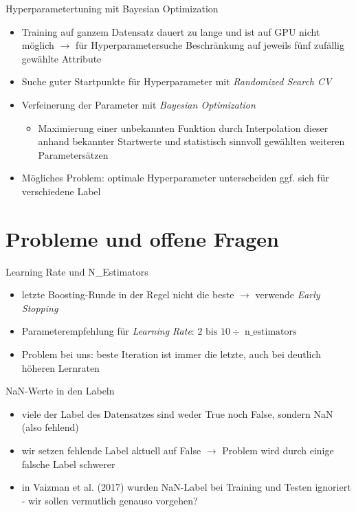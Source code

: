 \documentclass[10pt,%
	wide,%
	xcolor={x11names},%
	hyperref={colorlinks},%
	pantone312,%
	handout,%
	]{beamer}
\begin{document}
\begin{frame}[t]{Hyperparametertuning mit Bayesian Optimization}
	\begin{itemize}
		\item Training auf ganzem Datensatz dauert zu lange und ist auf GPU nicht möglich $\rightarrow$ für Hyperparametersuche Beschränkung auf jeweils fünf zufällig gewählte Attribute
		\item Suche guter Startpunkte für Hyperparameter mit \emph{Randomized Search CV}
		\item Verfeinerung der Parameter mit \emph{Bayesian Optimization}
		\begin{itemize}
			\item Maximierung einer unbekannten Funktion durch Interpolation dieser anhand bekannter Startwerte und statistisch sinnvoll gewählten weiteren Parametersätzen
		\end{itemize}
		\item Mögliches Problem: optimale Hyperparameter unterscheiden ggf. sich für verschiedene Label
	\end{itemize}
\end{frame}

\section{Probleme und offene Fragen}

\begin{frame}[t]{Learning Rate und N\_Estimators}
	\begin{itemize}
		\item letzte Boosting-Runde in der Regel nicht die beste $\rightarrow$ verwende \emph{Early Stopping}
		\item Parameterempfehlung für \emph{Learning Rate}: $2 \text{ bis } 10 \div \operatorname{n\_estimators}$
		\item Problem bei uns: beste Iteration ist immer die letzte, auch bei deutlich höheren Lernraten
	\end{itemize}
\end{frame}

\begin{frame}[t]{NaN-Werte in den Labeln}
	\begin{itemize}
		\item viele der Label des Datensatzes sind weder True noch False, sondern NaN (also fehlend)
		\item wir setzen fehlende Label aktuell auf False $\rightarrow$ Problem wird durch einige falsche Label schwerer
		\item in Vaizman et al. (2017) wurden NaN-Label bei Training und Testen ignoriert - wir sollen vermutlich genauso vorgehen?
	\end{itemize}
\end{frame}
\end{document}
